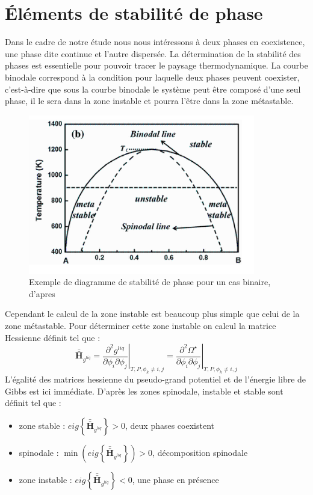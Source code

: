 \documentclass[a4paper,11pt,fleqn]{report}    %
\newcommand{\Mb}{\mathbf}
\newcommand{\doubleoverline}[1]{\bar{\bar{#1}}} 			%
\begin{document}
\section{Éléments de stabilité de phase}
Dans le cadre de notre étude nous nous intéressons à deux phases en coexistence, une phase dite continue et l'autre dispersée. La détermination de la stabilité des phases est essentielle pour pouvoir tracer le paysage thermodynamique. La courbe binodale correspond à la condition pour laquelle deux phases peuvent coexister, c'est-à-dire que sous la courbe binodale le système peut être composé d'une seul phase, il le sera dans la zone instable et pourra l'être dans la zone métastable.
\begin{figure}[h!]
	\centering
	\includegraphics[width=0.5\linewidth]{figure/metastable}
	\caption[Exemple de diagramme de stabilité de phase pour un cas binaire, d'apres]{Exemple de diagramme de stabilité de phase pour un cas binaire, d'apres}
	\label{fig:metastable}
\end{figure}
Cependant le calcul de la zone instable est beaucoup plus simple que celui de la zone métastable. Pour déterminer cette zone instable on calcul la matrice Hessienne définit tel que : 
\begin{equation}
	\Mb{\doubleoverline{H}}_{g^{liq}} = \left.\frac{\partial^2 g^{liq}}{\partial \phi_i \partial \phi_j}\right|_{T,P,\phi_k\neq i,j}
	=\left.\frac{\partial^2 \Omega^{\star}}{\partial \phi_i \partial \phi_j}\right|_{T,P,\phi_k\neq i,j}
\end{equation}
L'égalité des matrices hessienne du pseudo-grand potentiel et de l'énergie libre de Gibbs est ici immédiate. D'après \cite{aursand_spinodal_2017} les zones spinodale, instable et stable sont définit tel que :
\begin{itemize}
	\item zone stable : $\displaystyle eig\left\{\Mb{\doubleoverline{H}}_{g^{liq}} \right\} > 0$, deux phases coexistent \\ 
	\item spinodale : $\displaystyle \min \left( eig \left\{\Mb{\doubleoverline{H}}_{g^{liq}}\right\} \right) > 0$, décomposition spinodale \\
	\item zone instable : $\displaystyle eig\left\{\Mb{\doubleoverline{H}}_{g^{liq}} \right\} < 0$, une phase en présence \\ 
\end{itemize}
\end{document}
